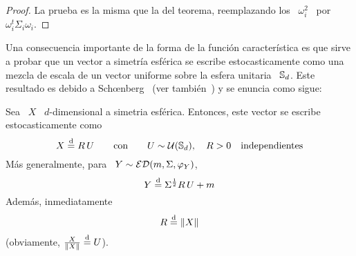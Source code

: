 %
\begin{proof}
  La prueba  es la misma que la  del teorema, reemplazando los  \ $\omega_i^2$ \
  por $\omega_i^t \Sigma_i \omega_i$.
\end{proof}

Una consecuencia importante de la  forma de la funci\'on caracter\'istica es que
sirve a probar que un vector a simetr\'ia esf\'erica se escribe estocasticamente
como  una mezcla de  escala de  un vector  uniforme sobre  la esfera  unitaria \
$\mathbb{S}_d$. Este resultado es  debido a Sch{\oe}nberg~\cite{Sch38, FanKot90} (ver
tambi\'en~\cite{KeiSte74, Tei60}) y se enuncia como sigue:
%
\begin{teorema}
\label{Teo:MP:MezclaUniforme}
%
  Sea \ $X$  \ $d$-dimensional a simetria esf\'erica.   Entonces, este vector se
  escribe estocasticamente como
  \[
  X \stackrel{\mathrm{d}}{=} R \, U \qquad \mbox{con} \qquad U \sim \mathcal{U}(\mathbb{S}_d), \quad R > 0 \quad
  \mbox{independientes}
  \]
  M\'as generalmente, para \ $Y \sim \mathcal{ED}(m,\Sigma,\varphi_Y)$,
  \[
  Y \stackrel{\mathrm{d}}{=} \Sigma^{\frac12} R \, U + m
  \]
  Adem\'as, inmediatamente
  \[
  R \stackrel{\mathrm{d}}{=} \| X \|
  \]
  (obviamente, $\frac{X}{\| X \|} \stackrel{\mathrm{d}}{=} U$).
\end{teorema}
%
